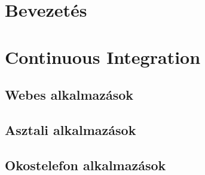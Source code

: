 \documentclass[12pt,a4paper,english,magyar,oneside]{report}
\begin{document}


\setcounter{tocdepth}{2} %
\tableofcontents %
\chapter{Bevezetés}


\chapter{Continuous Integration}


\section{Webes alkalmazások}


\section{Asztali alkalmazások}


\section{Okostelefon alkalmazások}


\newpage

\printbibliography


\end{document}
